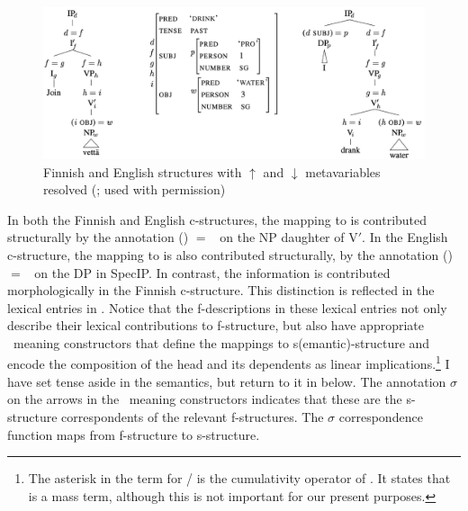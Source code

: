\documentclass[output=paper,hidelinks]{langscibook}
\begin{document}
\begin{figure}
  \centering
  \includegraphics[scale=.33]{figures/Glue/finnish-english-2.png}
  \caption{Finnish and English structures with $\uparrow$ and $\downarrow$
    metavariables resolved (\citealt[330]{asudeh22}; used with permission)}
  \label{fig:finn-eng2} 
\end{figure}

In both the Finnish and English c-structures, the mapping to  is contributed structurally by the annotation (\UP\OBJ) $=$ \Down\ on the NP daughter of {V$'$}. In the English c-structure, the
mapping to  is also contributed
structurally, by the annotation (\UP\SUBJ) $=$ \Down\ on the DP in SpecIP. In contrast, the
 information is contributed morphologically in the
Finnish c-structure. This distinction is reflected in the lexical
entries in . Notice that the
f-descriptions in these lexical entries not only describe their
lexical contributions to f-structure, but also have appropriate \glue\ meaning constructors that define the mappings
to s(emantic)-structure and encode the composition of the head and its
dependents as linear implications.\footnote{The asterisk in the
  term for / is the cumulativity operator
  of \citet{link83}. It states that  is a mass term,
  although this is not important for our present purposes.} I have
set tense aside in the semantics, but return to it in
 below.   The annotation $\sigma$ on
the arrows in the \glue\ meaning constructors indicates that these are the
s-structure correspondents of the relevant f-structures. The
$\sigma$ correspondence function maps from f-structure to
s-structure.
\end{document}
